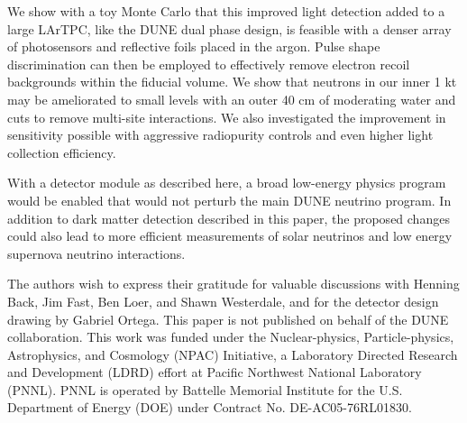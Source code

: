 \documentclass[a4paper,11pt]{article}
\begin{document}
We show with a toy Monte Carlo that this improved light detection added to a large LArTPC, like the DUNE dual phase design, is feasible with a denser array of photosensors and reflective foils placed in the argon. Pulse shape discrimination can then be employed to effectively remove electron recoil backgrounds within the fiducial volume. We show that neutrons in our inner 1 kt may be ameliorated to small levels with an outer 40 cm of moderating water and cuts to remove multi-site interactions. We also investigated the improvement in sensitivity possible with aggressive radiopurity controls and even higher light collection efficiency.

With a detector module as described here, a broad low-energy physics program would be enabled that would not perturb the main DUNE neutrino program. In addition to dark matter detection described in this paper, the proposed changes could also lead to more efficient measurements of solar neutrinos and low energy supernova neutrino interactions. 

\acknowledgments
The authors wish to express their gratitude for valuable discussions with Henning Back, Jim Fast, Ben Loer, and Shawn Westerdale,  and for the detector design drawing by Gabriel Ortega. This paper is not published on behalf of the DUNE collaboration. This work was funded under the Nuclear-physics, Particle-physics, Astrophysics, and Cosmology (NPAC) Initiative, a Laboratory Directed Research and Development (LDRD) effort at Pacific Northwest National Laboratory (PNNL). PNNL is operated by Battelle Memorial Institute  for  the  U.S.  Department  of  Energy  (DOE) under Contract No. DE-AC05-76RL01830.

\end{document}
